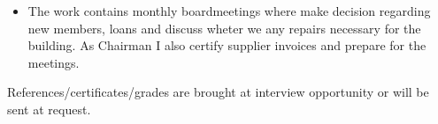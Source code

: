 \documentclass[10pt,a4paper,ragged2e]{altacv}
\begin{document}
\begin{fullwidth}
\divider

\begin{itemize}
  \item The work contains monthly boardmeetings where make decision regarding new members, 
  loans and discuss wheter we any repairs necessary for the building. As Chairman I also certify 
  supplier invoices and prepare for the meetings.
\end{itemize}

\divider


\divider


\divider


References/certificates/grades are brought at interview opportunity or will be sent at request.

\end{fullwidth}
\end{document}
